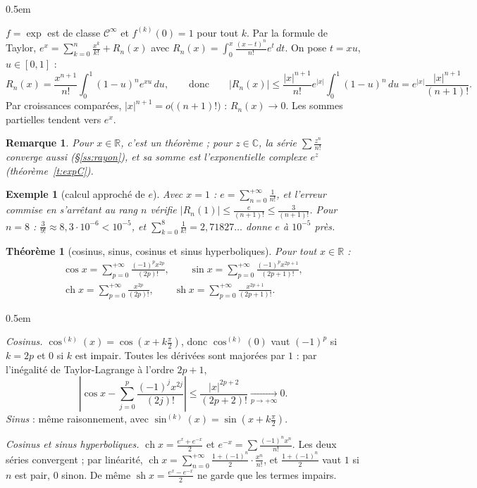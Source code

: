 \documentclass[a4paper,11pt]{article}
\makeatletter
\numberwithin{equation}{section}
\numberwithin{figure}{section}
\numberwithin{table}{section}
\theoremstyle{enonce}
\newtheorem{theoreme}[definition]{Théorème}
\theoremstyle{exemple}
\newtheorem{exemple}[definition]{Exemple}
\theoremstyle{remarque}
\newtheorem*{remarque}{Remarque}
\renewcommand{\proofname}{Démonstration}
\renewenvironment{proof}[1][\proofname]{\par\pushQED{\qed}\normalfont
  \topsep0.5em\relax\trivlist\item[\hskip\labelsep\sffamily\itshape\color{Gris}#1.]\ignorespaces}
  {\popQED\endtrivlist\@endpefalse}
\newcommand{\R}{\mathbb{R}}
\newcommand{\C}{\mathbb{C}}
\newcommand{\sh}{\operatorname{sh}}
\newcommand{\ch}{\operatorname{ch}}
\makeatother
\begin{document}
\begin{proof}
$f=\exp$ est de classe $\mathcal C^\infty$ et $f^{(k)}(0)=1$ pour tout $k$. Par la formule de Taylor,
$e^x=\sum_{k=0}^n\frac{x^k}{k!}+R_n(x)$ avec $R_n(x)=\int_0^x\frac{(x-t)^n}{n!}e^t\,dt$. On pose $t=xu$, $u\in[0,1]$ :
\[R_n(x)=\frac{x^{n+1}}{n!}\int_0^1(1-u)^ne^{xu}\,du,\qquad\text{donc}\qquad|R_n(x)|\leq\frac{|x|^{n+1}}{n!}e^{|x|}\int_0^1(1-u)^n\,du=e^{|x|}\frac{|x|^{n+1}}{(n+1)!}.\]
Par croissances comparées, $|x|^{n+1}=o\big((n+1)!\big)$ : $R_n(x)\to0$. Les sommes partielles tendent vers $e^x$.
\end{proof}

\begin{remarque}
Pour $x\in\R$, c'est un théorème ; pour $z\in\C$, la série $\sum\frac{z^n}{n!}$ converge aussi (§\ref{ss:rayon}), et sa somme est
l'exponentielle complexe $e^z$ (théorème~\ref{t:expC}).
\end{remarque}

\begin{exemple}[calcul approché de $e$]
Avec $x=1$ : $e=\sum_{n=0}^{+\infty}\frac1{n!}$, et l'erreur commise en s'arrêtant au rang $n$ vérifie $|R_n(1)|\leq\frac{e}{(n+1)!}\leq\frac3{(n+1)!}$.
Pour $n=8$ : $\frac3{9!}\approx8{,}3\cdot10^{-6}<10^{-5}$, et $\sum_{k=0}^8\frac1{k!}=2{,}71827\ldots$ donne $e$ à $10^{-5}$ près.
\end{exemple}

\begin{theoreme}[cosinus, sinus, cosinus et sinus hyperboliques]\label{t:trigo}
Pour tout $x\in\R$ :
\begin{gather*}\cos x=\sum_{p=0}^{+\infty}\frac{(-1)^px^{2p}}{(2p)!},\qquad\sin x=\sum_{p=0}^{+\infty}\frac{(-1)^px^{2p+1}}{(2p+1)!},\\
\ch x=\sum_{p=0}^{+\infty}\frac{x^{2p}}{(2p)!},\qquad\sh x=\sum_{p=0}^{+\infty}\frac{x^{2p+1}}{(2p+1)!}.\end{gather*}
\end{theoreme}

\begin{proof}
\emph{Cosinus.} $\cos^{(k)}(x)=\cos\left(x+k\frac\pi2\right)$, donc $\cos^{(k)}(0)$ vaut $(-1)^p$ si $k=2p$ et $0$ si $k$ est impair.
Toutes les dérivées sont majorées par $1$ : par l'inégalité de Taylor-Lagrange à l'ordre $2p+1$,
\[\left|\cos x-\sum_{j=0}^p\frac{(-1)^jx^{2j}}{(2j)!}\right|\leq\frac{|x|^{2p+2}}{(2p+2)!}\xrightarrow[p\to+\infty]{}0.\]
\emph{Sinus} : même raisonnement, avec $\sin^{(k)}(x)=\sin\left(x+k\frac\pi2\right)$.

\emph{Cosinus et sinus hyperboliques.} $\ch x=\frac{e^x+e^{-x}}2$ et $e^{-x}=\sum\frac{(-1)^nx^n}{n!}$. Les deux séries convergent ; par
linéarité, $\ch x=\sum_{n=0}^{+\infty}\frac{1+(-1)^n}2\cdot\frac{x^n}{n!}$, et $\frac{1+(-1)^n}2$ vaut $1$ si $n$ est pair, $0$ sinon.
De même $\sh x=\frac{e^x-e^{-x}}2$ ne garde que les termes impairs.
\end{proof}
\end{document}
